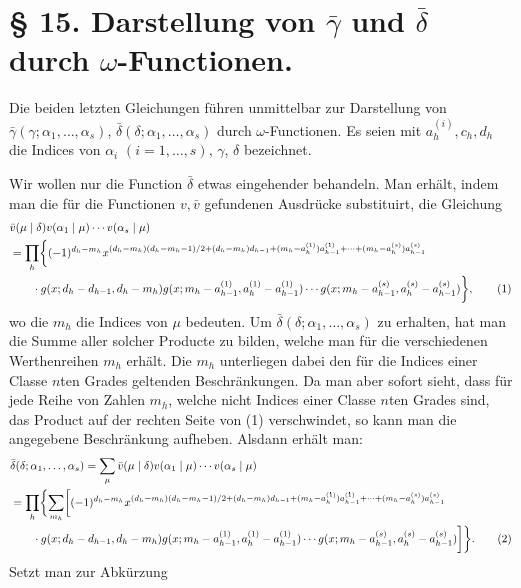 \section*{§ 15. Darstellung von $\bar\gamma$ und $\bar\delta$ durch $\omega$-Functionen.}

Die beiden letzten Gleichungen führen unmittelbar zur Darstellung von $\bar\gamma(\gamma;\alpha_1,
\ldots,\alpha_s)$, $\bar\delta(\delta;\alpha_1,
\ldots,\alpha_s)$ durch $\omega$-Functionen. Es seien mit $a_h^{(i)},c_h,d_h$ die Indices von $\alpha_i$ $(i=1,\ldots,s)$, $\gamma$, $\delta$ bezeichnet.

Wir wollen nur die Function $\bar\delta$ etwas eingehender behandeln. Man erhält, indem man die für die Functionen $v,\bar v$ gefundenen Ausdrücke substituirt, die Gleichung
\begin{align}
&\bar v(\mu\mid\delta)v(\alpha_1\mid\mu)\cdots v(\alpha_s\mid\mu)\notag\\
&=\prod_h\biggl\{(-1)^{d_h-m_h}
 x^{(d_h-m_h)(d_h-m_h-1)/2+(d_h-m_h)d_{h-1}+(m_h-a_h^{(1)})a_{h-1}^{(1)}+\cdots+(m_h-a_h^{(s)})a_{h-1}^{(s)}}
\notag\\
&\qquad\cdot g(x;d_h-d_{h-1},d_h-m_h)g(x;m_h-a_{h-1}^{(1)},a_h^{(1)}-a_{h-1}^{(1)})
\cdots g(x;m_h-a_{h-1}^{(s)},a_h^{(s)}-a_{h-1}^{(s)})\biggr\},
\tag{1}
\end{align}
wo die $m_h$ die Indices von $\mu$ bedeuten. Um $\bar\delta(\delta;\alpha_1,
\ldots,\alpha_s)$ zu erhalten, hat man die Summe aller solcher Producte zu bilden, welche man für die verschiedenen Werthenreihen $m_h$ erhält. Die $m_h$ unterliegen dabei den für die Indices einer Classe $n$ten Grades geltenden Beschränkungen. Da man aber sofort sieht, dass für jede Reihe von Zahlen $m_h$, welche nicht Indices einer Classe $n$ten Grades sind, das Product auf der rechten Seite von (1) verschwindet, so kann man die angegebene Beschränkung aufheben. Alsdann erhält man:
\begin{align}
&\bar\delta(\delta;\alpha_1,\ldots,\alpha_s)
 =\sum_\mu \bar v(\mu\mid\delta)v(\alpha_1\mid\mu)\cdots v(\alpha_s\mid\mu)\notag\\
&=\prod_h\biggl\{\sum_{m_h}\biggl[(-1)^{d_h-m_h}
 x^{(d_h-m_h)(d_h-m_h-1)/2+(d_h-m_h)d_{h-1}+(m_h-a_h^{(1)})a_{h-1}^{(1)}+\cdots+(m_h-a_h^{(s)})a_{h-1}^{(s)}}\notag\\
&\qquad\cdot g(x;d_h-d_{h-1},d_h-m_h)g(x;m_h-a_{h-1}^{(1)},a_h^{(1)}-a_{h-1}^{(1)})\cdots g(x;m_h-a_{h-1}^{(s)},a_h^{(s)}-a_{h-1}^{(s)})\biggr]\biggr\}.
\tag{2}
\end{align}
Setzt man zur Abkürzung
